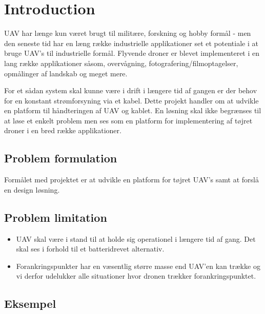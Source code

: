 \chapter{Introduction}

UAV har længe kun været brugt til militære, forskning og hobby formål - men den seneste tid har en læng række industrielle applikationer set et potentiale i at bruge UAV's til industrielle formål.
Flyvende droner er blevet implementeret i en lang række applikationer såsom, overvågning, fotografering/filmoptagelser, opmålinger af landskab og meget mere. 

For et sådan system skal kunne være i drift i længere tid af gangen er der behov for en konstant strømforsyning via et kabel. Dette projekt handler om at udvikle en platform til håndteringen af UAV og kablet.
En løsning skal ikke begrænses til at løse et enkelt problem men ses som en platform for implementering af tøjret droner i en bred række applikationer.


\section{Problem formulation}
Formålet med projektet er at udvikle en platform for tøjret UAV's samt at forslå en design løsning. 

\section{Problem limitation}
\begin{itemize}
\item UAV skal være i stand til at holde sig operationel i længere tid af gang. Det skal ses i forhold til et batteridrevet alternativ. 
\item Forankringspunkter har en væsentlig større masse end UAV'en kan  trække og vi derfor udelukker alle situationer hvor dronen trækker forankringspunktet.
\end{itemize}


\section{Eksempel}

